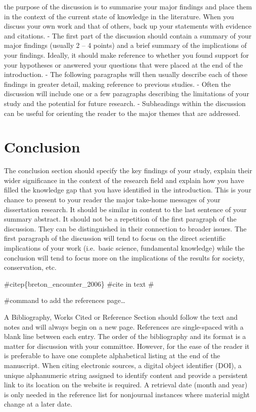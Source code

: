 \documentclass[
  11pt,
]{article}
\begin{document}
\begin{centering}
the purpose of the discussion is to summarise your major findings and
place them in the context of the current state of knowledge in the
literature. When you discuss your own work and that of others, back up
your statements with evidence and citations. - The first part of the
discussion should contain a summary of your major findings (usually 2 --
4 points) and a brief summary of the implications of your findings.
Ideally, it should make reference to whether you found support for your
hypotheses or answered your questions that were placed at the end of the
introduction. - The following paragraphs will then usually describe each
of these findings in greater detail, making reference to previous
studies. - Often the discussion will include one or a few paragraphs
describing the limitations of your study and the potential for future
research. - Subheadings within the discussion can be useful for
orienting the reader to the major themes that are addressed. \newpage

\hypertarget{conclusion}{%
\section{Conclusion}\label{conclusion}}

The conclusion section should specify the key findings of your study,
explain their wider significance in the context of the research field
and explain how you have filled the knowledge gap that you have
identified in the introduction. This is your chance to present to your
reader the major take-home messages of your dissertation research. It
should be similar in content to the last sentence of your summary
abstract. It should not be a repetition of the first paragraph of the
discussion. They can be distinguished in their connection to broader
issues. The first paragraph of the discussion will tend to focus on the
direct scientific implications of your work (i.e.~basic science,
fundamental knowledge) while the conclusion will tend to focus more on
the implications of the results for society, conservation, etc. \newpage

\#citep\{breton\_encounter\_2006\} \#cite in text \#



\#command to add the references page\ldots{}

A Bibliography, Works Cited or Reference Section should follow the text
and notes and will always begin on a new page. References are
single-spaced with a blank line between each entry. The order of the
bibliography and its format is a matter for discussion with your
committee. However, for the ease of the reader it is preferable to have
one complete alphabetical listing at the end of the manuscript. When
citing electronic sources, a digital object identifier (DOI), a unique
alphanumeric string assigned to identify content and provide a
persistent link to its location on the website is required. A retrieval
date (month and year) is only needed in the reference list for
nonjournal instances where material might change at a later date.
\newpage


\end{centering}
\end{document}
